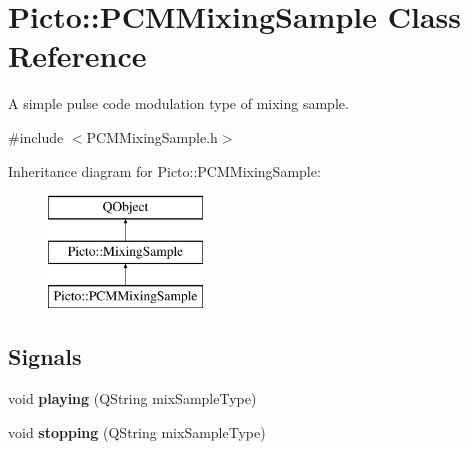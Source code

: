 \hypertarget{class_picto_1_1_p_c_m_mixing_sample}{\section{Picto\-:\-:P\-C\-M\-Mixing\-Sample Class Reference}
\label{class_picto_1_1_p_c_m_mixing_sample}
}


A simple pulse code modulation type of mixing sample.  




{\ttfamily \#include $<$P\-C\-M\-Mixing\-Sample.\-h$>$}

Inheritance diagram for Picto\-:\-:P\-C\-M\-Mixing\-Sample\-:\begin{figure}[H]
\begin{center}
\leavevmode
\includegraphics[height=3.000000cm]{class_picto_1_1_p_c_m_mixing_sample}
\end{center}
\end{figure}
\subsection*{Signals}
\begin{DoxyCompactItemize}
\item 
\hypertarget{class_picto_1_1_p_c_m_mixing_sample_afd0039e88682e3466667475b50637cd5}{void {\bfseries playing} (Q\-String mix\-Sample\-Type)}\label{class_picto_1_1_p_c_m_mixing_sample_afd0039e88682e3466667475b50637cd5}

\item 
\hypertarget{class_picto_1_1_p_c_m_mixing_sample_a1539ce4cee5ade8b3b4b9374fd197c52}{void {\bfseries stopping} (Q\-String mix\-Sample\-Type)}\label{class_picto_1_1_p_c_m_mixing_sample_a1539ce4cee5ade8b3b4b9374fd197c52}

\end{DoxyCompactItemize}
